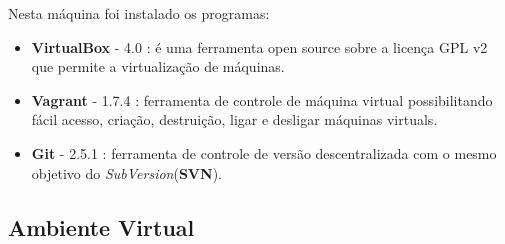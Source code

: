 Nesta máquina foi instalado os programas:

\begin{itemize}
    \item \textbf{VirtualBox} - 4.0 : é uma ferramenta open source sobre a
 licença GPL v2 que permite a virtualização de máquinas.
    \item \textbf{Vagrant} - 1.7.4 : ferramenta de controle de
 máquina virtual possibilitando fácil acesso, criação, destruição, ligar e 
desligar máquinas virtuals.
    \item \textbf{Git} - 2.5.1 : ferramenta de controle de versão descentralizada
com o mesmo objetivo do \textit{SubVersion}(\textbf{SVN}).
\end{itemize}

\subsection{Ambiente Virtual}

